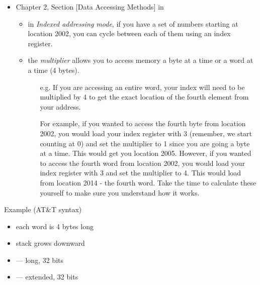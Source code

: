 \begin{itemize}
\item Chapter 2, Section [Data Accessing Methods] in \cite{bartlett2009programming}
  \begin{itemize}
  \item in \emph{Indexed addressing mode}, if you have a set of numbers starting at
    location 2002, you can cycle between each of them using an index register.
  \item the \emph{multiplier} allows you to access memory a byte at a time or a word at a
    time (4 bytes).
    \begin{itemize}
    \item[e.g.] If you are accessing an entire word, your index will need to be multiplied
      by 4 to get the exact location of the fourth element from your address.

      For example, if you wanted to access the fourth byte from location 2002, you would
      load your index register with 3 (remember, we start counting at 0) and set the
      multiplier to 1 since you are going a byte at a time. This would get you location
      2005. However, if you wanted to access the fourth word from location 2002, you would
      load your index register with 3 and set the multiplier to 4. This would load from
      location 2014 - the fourth word. Take the time to calculate these yourself to make
      sure you understand how it works.
    \end{itemize}
  \end{itemize}
\end{itemize}

\begin{frame}
  \begin{block}{Example \scriptsize{(AT\&T syntax)}}
     
  \end{block}
  \begin{itemize}
  \item each word is 4 bytes long
  \item stack grows downward
  \item {} --- long, 32 bits
  \item {} --- extended, 32 bits
  \end{itemize}
\end{frame}

